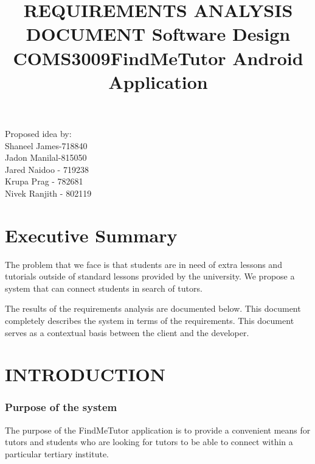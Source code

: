 \documentclass[12pt]{article}
\begin{document}
\title{\textbf{REQUIREMENTS ANALYSIS DOCUMENT }}
\maketitle

\begin{center}
\title{\textbf{Software Design COMS3009}}
\maketitle 
\end{center}
\begin{center}
\title{\textbf{FindMeTutor Android Application}}
\maketitle 
\end{center}

\begin{center}
Proposed idea by:\\
Shaneel James-718840
\\Jadon Manilal-815050
\\Jared Naidoo - 719238
\\Krupa Prag - 782681
\\Nivek Ranjith - 802119
\end{center}


\newpage
\tableofcontents
\newpage


\section{\textbf{Executive Summary}}
\begin{flushleft}
The problem that we face is that students are in need of extra lessons and tutorials outside of standard lessons provided by the university. We propose a system that can connect students in search of tutors.

The results of the requirements analysis are documented below. This document completely describes the system in terms of the requirements. This document serves as a contextual basis between the client and the developer.
\end{flushleft}
\newpage
\section{INTRODUCTION}
\subsubsection{Purpose of the system}
\begin{flushleft}
The purpose of the FindMeTutor application is to provide a convenient means for tutors and students who are looking for tutors to be able to connect within a particular tertiary institute.
\end{flushleft}
\end{document}
